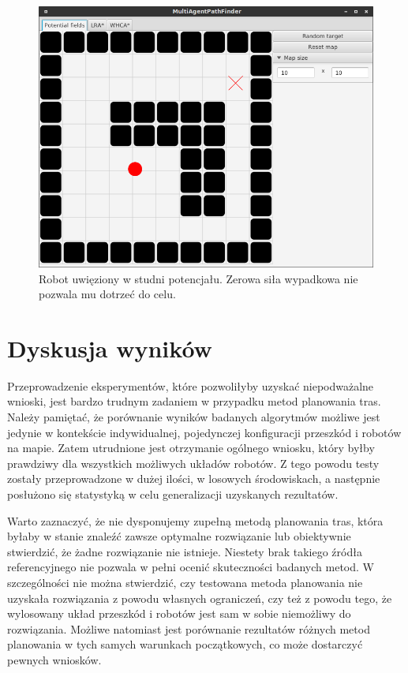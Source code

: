 \begin{figure}
	\centering
	\includegraphics[width=0.8\columnwidth]{img/robopath/field-potential-hole}
	\caption{Robot uwięziony w studni potencjału. Zerowa siła wypadkowa nie pozwala mu dotrzeć do celu.}
	\label{fig:test-field-potential-hole}
\end{figure}

\section{Dyskusja wyników}
Przeprowadzenie eksperymentów, które pozwoliłyby uzyskać niepodważalne wnioski, jest bardzo trudnym zadaniem w przypadku metod planowania tras.
Należy pamiętać, że porównanie wyników badanych algorytmów możliwe jest jedynie w kontekście indywidualnej, pojedynczej konfiguracji przeszkód i robotów na mapie.
Zatem utrudnione jest otrzymanie ogólnego wniosku, który byłby prawdziwy dla wszystkich możliwych układów robotów.
Z tego powodu testy zostały przeprowadzone w dużej ilości, w losowych środowiskach, a następnie posłużono się statystyką w celu generalizacji uzyskanych rezultatów.

Warto zaznaczyć, że nie dysponujemy zupełną metodą planowania tras, która byłaby w stanie znaleźć zawsze optymalne rozwiązanie lub obiektywnie stwierdzić, że żadne rozwiązanie nie istnieje.
Niestety brak takiego źródła referencyjnego nie pozwala w pełni ocenić skuteczności badanych metod. W szczególności nie można stwierdzić, czy testowana metoda planowania nie uzyskała rozwiązania z powodu własnych ograniczeń, czy też z powodu tego, że wylosowany układ przeszkód i robotów jest sam w sobie niemożliwy do rozwiązania.
Możliwe natomiast jest porównanie rezultatów różnych metod planowania w tych samych warunkach początkowych, co może dostarczyć pewnych wniosków.

